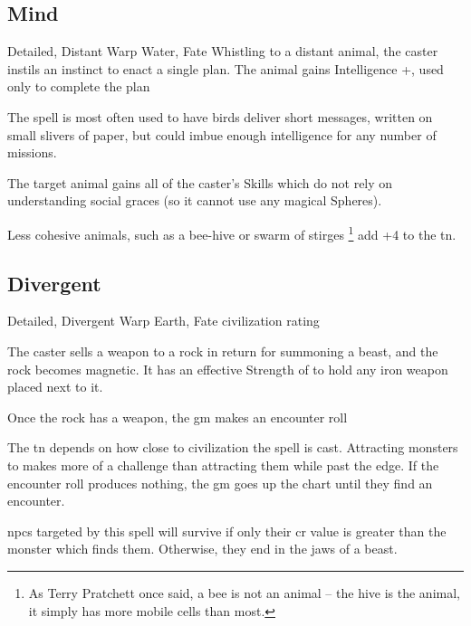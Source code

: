 \begin{multicols}{2}
\subsection{Mind}

\label{carrierCrow}
  {Detailed, Distant}%
  {Warp}%
  {Water, Fate}%
  {}%
  {Whistling to a distant animal, the caster instils an instinct to enact a single plan.
  The animal gains Intelligence +, used only to complete the plan}%
  {
  The spell is most often used to have birds deliver short messages, written on small slivers of paper, but could imbue enough intelligence for any number of missions.

  The target animal gains all of the caster's Skills which do not rely on understanding social graces (so it cannot use any magical Spheres).

  Less cohesive animals, such as a bee-hive or swarm of stirges%
  \footnote{As Terry Pratchett once said, a bee is not an animal -- the hive is the animal, it simply has more mobile cells than most.}
  add +4 to the \gls{tn}.
  }


\subsection{Divergent}

  {Detailed, Divergent}%
  {Warp}%
  {Earth, Fate}%
  {civilization rating}%
  {The caster sells a weapon to a rock in return for summoning a beast, and the rock becomes magnetic.
  It has an effective Strength of  to hold any iron weapon placed next to it.

  Once the rock has a weapon, the \gls{gm} makes an encounter roll}%
  {
    The \gls{tn} depends on how close to civilization the spell is cast.
    Attracting \glspl{monster} to  makes more of a challenge than attracting them while past the \gls{edge}.%
    If the encounter roll produces nothing, the \gls{gm} goes up the chart until they find an encounter.

    \Glspl{npc} targeted by this spell will survive if only their \gls{cr} value is greater than the \gls{monster} which finds them.
    Otherwise, they end in the jaws of a beast.
  }


\end{multicols}
